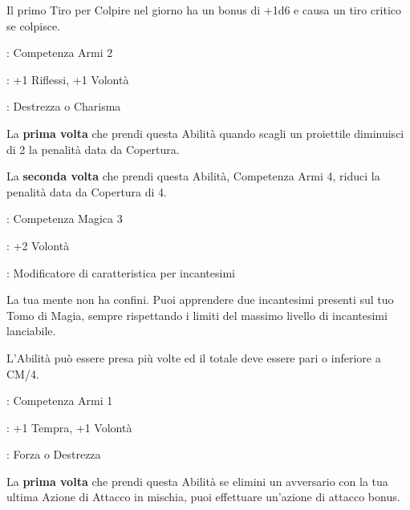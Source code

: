 \begin{multicols}{2}
Il primo Tiro per Colpire nel giorno ha un bonus di +1d6 e causa un tiro critico se colpisce.

\begin{description}[noitemsep, topsep=0pt, parsep=0pt, partopsep=0pt, leftmargin=0cm, labelwidth=2.5cm]
    \item[\textbf{Requisito}]: Competenza Armi 2
    \item[\textbf{Tiri Salvezza}]: +1 Riflessi, +1 Volontà
    \item[\textbf{Caratteristica}]: Destrezza o Charisma
\end{description}

La \textbf{prima volta} che prendi questa Abilità quando scagli un proiettile diminuisci di 2 la penalità data da Copertura.

La \textbf{seconda volta} che prendi questa Abilità, Competenza Armi 4, riduci la penalità data da Copertura di 4.

\begin{description}[noitemsep, topsep=0pt, parsep=0pt, partopsep=0pt, leftmargin=0cm, labelwidth=2.5cm]
    \item[\textbf{Requisito}]: Competenza Magica 3
    \item[\textbf{Tiri Salvezza}]: +2 Volontà
    \item[\textbf{Caratteristica}]: Modificatore di caratteristica per incantesimi
\end{description}

La tua mente non ha confini. Puoi apprendere due incantesimi presenti sul tuo Tomo di Magia, sempre rispettando i limiti del massimo livello di incantesimi lanciabile.

L'Abilità può essere presa più volte ed il totale deve essere pari o inferiore a CM/4.

\begin{description}[noitemsep, topsep=0pt, parsep=0pt, partopsep=0pt, leftmargin=0cm, labelwidth=2.5cm]
    \item[\textbf{Requisito}]: Competenza Armi 1
    \item[\textbf{Tiri Salvezza}]: +1 Tempra, +1 Volontà
    \item[\textbf{Caratteristica}]: Forza o Destrezza
\end{description}

La \textbf{prima volta} che prendi questa Abilità se elimini un avversario con la tua ultima Azione di Attacco in mischia, puoi effettuare un'azione di attacco bonus.


\end{multicols}
